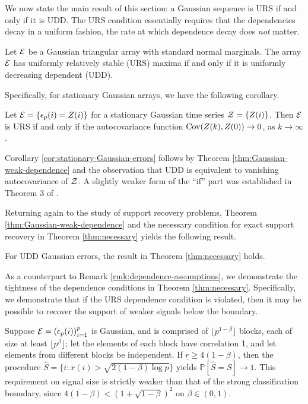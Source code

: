We now state the main result of this section: a Gaussian sequence is URS if and only if it is UDD.
The URS condition essentially requires that the dependencies decay in a uniform fashion, the rate at which dependence decay does \emph{not} matter.

\begin{theorem} \label{thm:Gaussian-weak-dependence}
Let ${\cal E}$ be a Gaussian triangular array with standard normal marginals.  
The array ${\cal E}$ has uniformly relatively stable (URS) maxima if and only if it is uniformly decreasing dependent (UDD).
\end{theorem}


Specifically, for stationary Gaussian arrays, we have the following corollary.

\begin{corollary} \label{cor:stationary-Gaussian-errors}
Let ${\cal E} = \{\epsilon_p(i) = Z(i)\}$ for a stationary Gaussian time series ${\cal Z} = \{Z(i)\}$.
Then $\cal E$ is {URS} if and only if the autocovariance function ${\rm {Cov}}(Z(k), Z(0))\to 0$, as $k\to\infty$.
\end{corollary}

Corollary \ref{cor:stationary-Gaussian-errors} follows by Theorem \ref{thm:Gaussian-weak-dependence} and the observation that UDD is equivalent to vanishing autocovariance of $\cal Z$.
A slightly weaker form of the ``if'' part was established in Theorem 3 of \cite{berman1964limit}.

Returning again to the study of support recovery problems, Theorem \ref{thm:Gaussian-weak-dependence} and the necessary condition for exact support recovery in Theorem \ref{thm:necessary} yields the following result.

\begin{corollary} \label{cor:weakly-dependent-errors}
For UDD Gaussian errors, the result in Theorem \ref{thm:necessary} holds.
\end{corollary}

As a counterpart to Remark \ref{rmk:dependence-assumptions}, we demonstrate the tightness of the dependence conditions in Theorem \ref{thm:necessary}.
Specifically, we demonstrate that if the URS dependence condition is violated, then it may be possible to recover the support of weaker signals below the boundary.

\begin{example} \label{exmp:counter-example}
Suppose ${\cal E} = \left(\epsilon_p(i)\right)_{i=1}^p$ is Gaussian, and is comprised of $\lfloor p^{1-\beta}\rfloor$ blocks, each of size at least $\lfloor p^\beta \rfloor$; 
let the elements of each block have correlation 1, and let elements from different blocks be independent. 
If $\underline{r} \ge 4(1-\beta)$, then the procedure $\widehat{S} = \big\{i:x(i)>\sqrt{2(1-\beta)\log{p}}\big\}$ yields $\mathbb P[\widehat{S} = S] \to 1$. 
This requirement on signal size is strictly weaker than that of the strong classification boundary, since $4(1-\beta) < (1 + \sqrt{1-\beta})^2$ on $\beta\in(0,1)$.
\end{example} 

